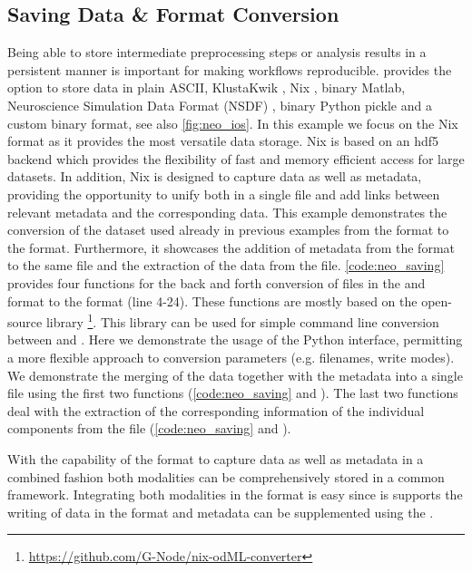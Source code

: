 \subsection{Saving Data \& Format Conversion}
\label{sec:nix_format}
Being able to store intermediate preprocessing steps or analysis results in a persistent manner is important for making workflows reproducible.  provides the option to store data in plain ASCII, KlustaKwik \citep{Hazan_2006}, Nix \citep{Stoewer_2014}, binary Matlab, Neuroscience Simulation Data Format (NSDF) \citep{Ray_2016}, binary Python pickle and a custom binary format, see also \cref{fig:neo_ios}. In this example we focus on the Nix format as it provides the most versatile data storage. Nix is based on an hdf5 \citep{TheHDFGroup_1997} backend which provides the flexibility of fast and memory efficient access for large datasets. In addition, Nix is designed to capture data as well as metadata, providing the opportunity to unify both in a single file and add links between relevant metadata and the corresponding data. 
This example demonstrates the conversion of the dataset used already in previous examples from the  format to the  format. Furthermore, it showcases the addition of metadata from the  format to the same file and the extraction of the data from the  file.
\cref{code:neo_saving} provides four functions for the back and forth conversion of files in the  and  format to the  format (line 4-24). These functions are mostly based on the open-source  library \footnote{\url{https://github.com/G-Node/nix-odML-converter}}. This library can be used for simple command line conversion between  and . Here we demonstrate the usage of the Python interface, permitting a more flexible approach to conversion parameters (e.g. filenames, write modes).
We demonstrate the merging of the data together with the metadata into a single  file using the first two functions (\cref{code:neo_saving}  and ). The last two functions deal with the extraction of the corresponding information of the individual components from the  file (\cref{code:neo_saving}  and ).

With the capability of the  format to capture data as well as metadata in a combined fashion both modalities can be comprehensively stored in a common framework. Integrating both modalities in the  format is easy since  is supports the writing of data in the  format and metadata can be supplemented using the .

